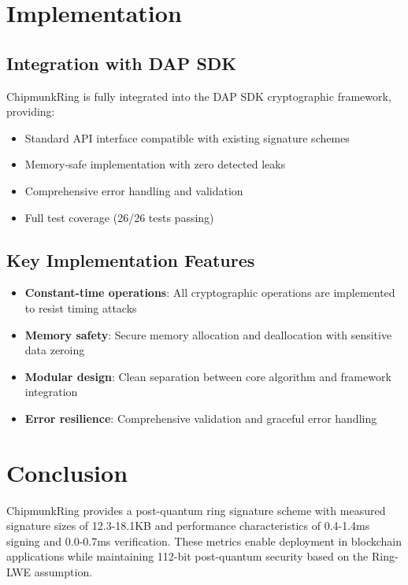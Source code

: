 \documentclass[11pt,a4paper]{article}
\begin{document}
\section{Implementation}

\subsection{Integration with DAP SDK}

ChipmunkRing is fully integrated into the DAP SDK cryptographic framework, providing:

\begin{itemize}
\item Standard API interface compatible with existing signature schemes
\item Memory-safe implementation with zero detected leaks
\item Comprehensive error handling and validation
\item Full test coverage (26/26 tests passing)
\end{itemize}

\subsection{Key Implementation Features}

\begin{itemize}
\item \textbf{Constant-time operations}: All cryptographic operations are implemented to resist timing attacks
\item \textbf{Memory safety}: Secure memory allocation and deallocation with sensitive data zeroing
\item \textbf{Modular design}: Clean separation between core algorithm and framework integration
\item \textbf{Error resilience}: Comprehensive validation and graceful error handling
\end{itemize}

\section{Conclusion}

ChipmunkRing provides a post-quantum ring signature scheme with measured signature sizes of 12.3-18.1KB and performance characteristics of 0.4-1.4ms signing and 0.0-0.7ms verification. These metrics enable deployment in blockchain applications while maintaining 112-bit post-quantum security based on the Ring-LWE assumption.
\end{document}
